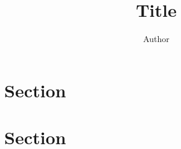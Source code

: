 \documentclass[11pt,compact]{khabstract}
\title{Title}
\author{Author}
\begin{document}
\maketitle

\section{Section}
\lipsum[1-2]

\section{Section}
\lipsum[2-3]
\end{document}
